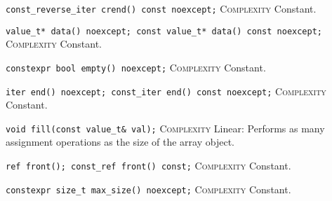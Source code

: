\noindent{}\hspace*{0.25em}\lstinline[basicstyle=\ttfamily\color{cgreen}]{const_reverse_iter crend() const noexcept;} \textsc{Complexity} Constant.\\\vspace{-0.6em}

\noindent{}\hspace*{0.25em}\lstinline[basicstyle=\ttfamily\color{cgreen}]{value_t* data() noexcept; const value_t* data() const noexcept;} \textsc{Complexity} Constant.\\\vspace{-0.6em}

\noindent{}\hspace*{0.25em}\lstinline[basicstyle=\ttfamily\color{cgreen}]{constexpr bool empty() noexcept;} \textsc{Complexity} Constant.\\\vspace{-0.6em}

\noindent{}\hspace*{0.25em}\lstinline[basicstyle=\ttfamily\color{cgreen}]{iter end() noexcept; const_iter end() const noexcept;} \textsc{Complexity} Constant.\\\vspace{-0.6em}

\noindent{}\hspace*{0.25em}\lstinline[basicstyle=\ttfamily\color{corange}]{void fill(const value_t& val);} \textsc{Complexity} Linear: Performs as many assignment operations as the size of the array object.\\\vspace{-0.6em}

\noindent{}\hspace*{0.25em}\lstinline[basicstyle=\ttfamily\color{cgreen}]{ref front(); const_ref front() const;} \textsc{Complexity} Constant.\\\vspace{-0.6em}

\noindent{}\hspace*{0.25em}\lstinline[basicstyle=\ttfamily\color{cgreen}]{constexpr size_t max_size() noexcept;} \textsc{Complexity} Constant.\\\vspace{-0.6em}

